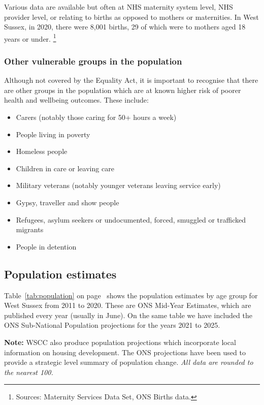 \begin{tcolorbox}[title={Maternity}, colback={boxcolour}]
    \small Various data are available but often at NHS maternity system level, NHS provider level, or relating to births as opposed to mothers or maternities. In West Sussex, in 2020, there were 8,001 births, 29 of which were to mothers aged 18 years or under. \footnote{Sources: Maternity Services Data Set, ONS Births data.}
\end{tcolorbox}
\subsubsection{Other vulnerable groups in the population}
Although not covered by the Equality Act, it is important to recognise that there are other groups in the population which are at known higher risk of poorer health and wellbeing outcomes. These include:
\begin{itemize}[noitemsep]
    \item Carers (notably those caring for 50+ hours a week) 
    \item People living in poverty 
    \item Homeless people 
    \item Children in care or leaving care 
    \item Military veterans (notably younger veterans leaving service early) 
    \item Gypsy, traveller and show people 
    \item Refugees, asylum seekers or undocumented, forced, smuggled or trafficked migrants 
    \item People in detention
\end{itemize}

\subsection{Population estimates}
Table~\ref{tab:population} on page~\pageref{tab:population} shows the population estimates by age group for West Sussex from 2011 to 2020. These are ONS Mid-Year Estimates, which are published every year (usually in June). On the same table we have included the ONS Sub-National Population projections for the years 2021 to 2025.

{\bf Note:} WSCC also produce population projections which incorporate local information on housing development. The ONS projections have been used to provide a strategic level summary of population change. {\em All data are rounded to the nearest 100.}

